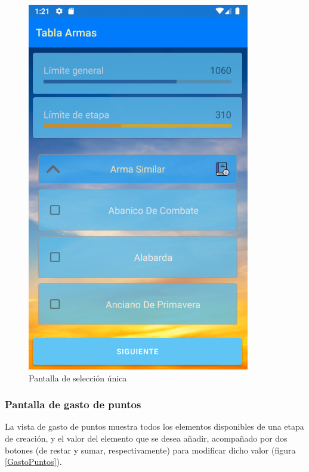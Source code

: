 \begin{figure}[H]
    \centering
    \includegraphics[scale=0.3]{Figures/Capturas/SeleccionMultipleGrupo.png}
    \caption{Pantalla de selección única}
    \label{SeleccionMultipleGrupos}    
\end{figure}

\subsubsection{Pantalla de gasto de puntos}
La vista de gasto de puntos muestra todos los elementos disponibles de una etapa de creación, y el valor del elemento 
que se desea añadir, acompañado por dos botones (de restar y sumar, respectivamente) para modificar dicho valor 
(figura \ref*{GastoPuntos}).

